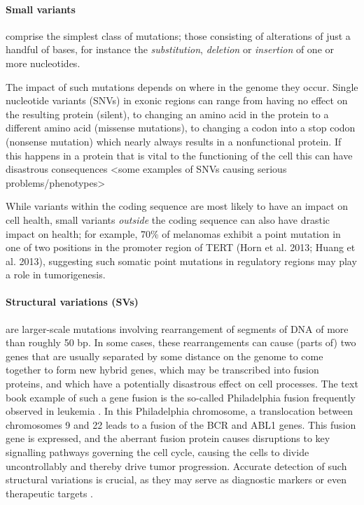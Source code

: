 \begin{justify}
\paragraph{Small variants} comprise the simplest class of mutations; those consisting of alterations of just a handful of bases, for instance the \emph{substitution}, \emph{deletion} or \emph{insertion} of one or more nucleotides.

The impact of such mutations depends on where in the genome they occur. Single nucleotide variants (SNVs) in exonic regions can range from having no effect on the resulting protein (silent), to changing an amino acid in the protein to a different amino acid (missense mutations), to changing a codon into a stop codon (nonsense mutation) which nearly always results in a nonfunctional protein. If this happens in a protein that is vital to the functioning of the cell this can have disastrous consequences <some examples of SNVs causing serious problems/phenotypes>

While variants within the coding sequence are most likely to have an impact on cell health, small variants \emph{outside} the coding sequence can also have drastic impact on health; for example, 70\% of melanomas exhibit a point mutation in one of two positions in the promoter region of TERT (Horn et al. 2013; Huang et al. 2013), suggesting such somatic point mutations in regulatory regions may play a role in tumorigenesis.

\paragraph{Structural variations (SVs)} are larger-scale mutations involving rearrangement of segments of DNA of more than roughly 50 bp. In some cases, these rearrangements can cause (parts of) two genes that are usually separated by some distance on the genome to come together to form new hybrid genes, which may be transcribed into fusion proteins, and which have a potentially disastrous effect on cell processes. The text book example of such a gene fusion is the so-called Philadelphia fusion frequently observed in leukemia \cite{TODO}. In this Philadelphia chromosome, a translocation between chromosomes 9 and 22 leads to a fusion of the BCR and ABL1 genes. This fusion gene is expressed, and the aberrant fusion protein causes disruptions to key signalling pathways governing the cell cycle, causing the cells to divide uncontrollably and thereby drive tumor progression. Accurate detection of such structural variations is crucial, as they may serve as diagnostic markers \cite{nowell1960chromosome,nowell1961chromosome} or even therapeutic targets \cite{druker2001activity, druker2001efficacy}.


\end{justify}
